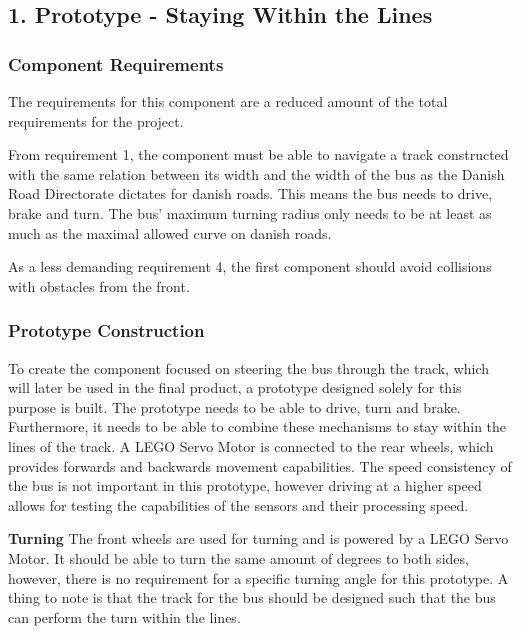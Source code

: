 \subsection{1. Prototype - Staying Within the Lines}

\subsubsection{Component Requirements}
The requirements for this component are a reduced amount of the total requirements for the project.

From requirement 1, the component must be able to navigate a track constructed with the same relation between its width and the width of the bus as the Danish Road Directorate dictates for danish roads. This means the bus needs to drive, brake and turn. The bus' maximum turning radius only needs to be at least as much as the maximal allowed curve on danish roads. 

As a less demanding requirement 4, the first component should avoid collisions with obstacles from the front. 

\subsubsection{Prototype Construction}
To create the component focused on steering the bus through the track, which will later be used in the final product, a prototype designed solely for this purpose is built. The prototype needs to be able to drive, turn and brake. Furthermore, it needs to be able to combine these mechanisms to stay within the lines of the track. A LEGO Servo Motor is connected to the rear wheels, which provides forwards and backwards movement capabilities. The speed consistency of the bus is not important in this prototype, however driving at a higher speed allows for testing the capabilities of the sensors and their processing speed.

\textbf{Turning}\newline
The front wheels are used for turning and is powered by a LEGO Servo Motor. It should be able to turn the same amount of degrees to both sides, however, there is no requirement for a specific turning angle for this prototype. A thing to note is that the track for the bus should be designed such that the bus can perform the turn within the lines.

